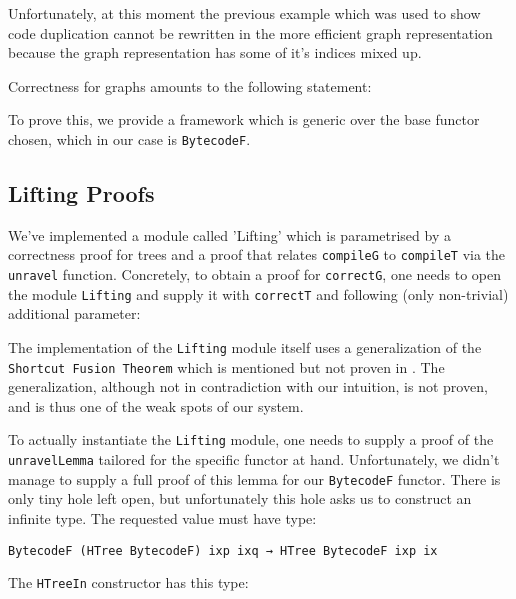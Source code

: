 \documentclass[a4paper]{article}
\begin{document}
        Unfortunately, at this moment the previous example which was used to show code duplication cannot be rewritten in the more efficient graph 
        representation because the graph representation has some of it's indices mixed up.
        
        Correctness for graphs amounts to the following statement:
        
        
        To prove this, we provide a framework which is generic over the base functor chosen, which in our case is \texttt{BytecodeF}. 
        
        \subsection{Lifting Proofs}
        
        
        We've implemented a module called 'Lifting' which is parametrised by a correctness proof for trees and a proof that relates \texttt{compileG} 
        to \texttt{compileT} via the \texttt{unravel} function. Concretely, to obtain a proof for \texttt{correctG}, one needs to open the module 
        \texttt{Lifting} and supply it with \texttt{correctT} and following (only non-trivial) additional parameter:
        
        
        The implementation of the \texttt{Lifting} module itself uses a generalization of the \texttt{Shortcut Fusion Theorem} which is mentioned but not proven in \cite{compiler-correctness-structured-graphs}.
        The generalization, although not in contradiction with our intuition, is not proven, and is thus one of the weak spots of our system.
        
        To actually instantiate the \texttt{Lifting} module, one needs to supply a proof of the \texttt{unravelLemma} tailored for the specific functor at hand. 
        Unfortunately, we didn't manage to supply a full proof of this lemma for our \texttt{BytecodeF} functor. There is only tiny hole left open, but 
        unfortunately this hole asks us to construct an infinite type. The requested value must have type:
        \begin{verbatim}
BytecodeF (HTree BytecodeF) ixp ixq → HTree BytecodeF ixp ix
        \end{verbatim}
        
        The \texttt{HTreeIn} constructor has this type:
        
\end{document}
